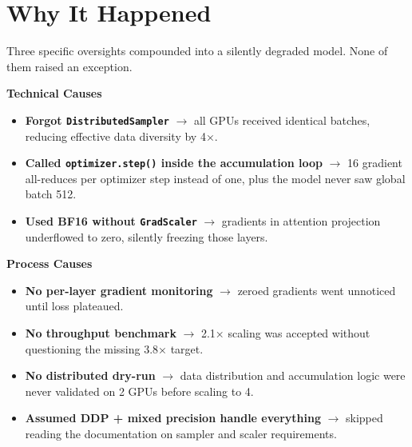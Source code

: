 \documentclass[11pt]{article}
\begin{document}
\vfill
\newpage

\section*{Why It Happened}

\vspace{0.05in}

{\fontsize{11}{13}\selectfont\color{brandgray}
Three specific oversights compounded into a silently degraded model. None of them raised an exception.
}

\vspace{0.2in}

\begin{minipage}[t]{0.47\textwidth}

{\large\color{brandorange}\textbf{Technical Causes}}

\vspace{0.1in}
\begin{itemize}[leftmargin=*, itemsep=0.12in, label={\color{brandblue}\textbullet}]
    \item \textbf{Forgot \texttt{DistributedSampler}} $\rightarrow$ all GPUs received identical batches, reducing effective data diversity by 4×.
    \item \textbf{Called \texttt{optimizer.step()} inside the accumulation loop} $\rightarrow$ 16 gradient all-reduces per optimizer step instead of one, plus the model never saw global batch 512.
    \item \textbf{Used BF16 without \texttt{GradScaler}} $\rightarrow$ gradients in attention projection underflowed to zero, silently freezing those layers.
\end{itemize}

\end{minipage}
\hfill
\begin{minipage}[t]{0.47\textwidth}

{\large\color{brandorange}\textbf{Process Causes}}

\vspace{0.1in}
\begin{itemize}[leftmargin=*, itemsep=0.12in, label={\color{brandblue}\textbullet}]
    \item \textbf{No per-layer gradient monitoring} $\rightarrow$ zeroed gradients went unnoticed until loss plateaued.
    \item \textbf{No throughput benchmark} $\rightarrow$ 2.1× scaling was accepted without questioning the missing 3.8× target.
    \item \textbf{No distributed dry-run} $\rightarrow$ data distribution and accumulation logic were never validated on 2 GPUs before scaling to 4.
    \item \textbf{Assumed DDP + mixed precision handle everything} $\rightarrow$ skipped reading the documentation on sampler and scaler requirements.
\end{itemize}

\end{minipage}
\end{document}
